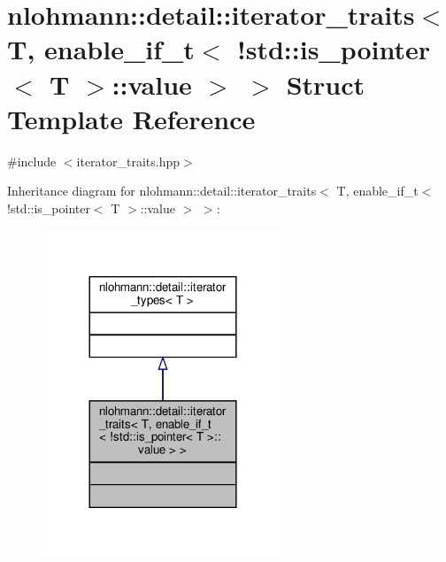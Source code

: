 \hypertarget{structnlohmann_1_1detail_1_1iterator__traits_3_01_t_00_01enable__if__t_3_01_9std_1_1is__pointer_3_01_t_01_4_1_1value_01_4_01_4}{}\section{nlohmann\+:\+:detail\+:\+:iterator\+\_\+traits$<$ T, enable\+\_\+if\+\_\+t$<$ !std\+:\+:is\+\_\+pointer$<$ T $>$\+:\+:value $>$ $>$ Struct Template Reference}
\label{structnlohmann_1_1detail_1_1iterator__traits_3_01_t_00_01enable__if__t_3_01_9std_1_1is__pointer_3_01_t_01_4_1_1value_01_4_01_4}


{\ttfamily \#include $<$iterator\+\_\+traits.\+hpp$>$}



Inheritance diagram for nlohmann\+:\+:detail\+:\+:iterator\+\_\+traits$<$ T, enable\+\_\+if\+\_\+t$<$ !std\+:\+:is\+\_\+pointer$<$ T $>$\+:\+:value $>$ $>$\+:\nopagebreak
\begin{figure}[H]
\begin{center}
\leavevmode
\includegraphics[width=204pt]{structnlohmann_1_1detail_1_1iterator__traits_3_01_t_00_01enable__if__t_3_01_9std_1_1is__pointer_9e42d78d8a69b8b9f7486f18562b11fc}
\end{center}
\end{figure}



